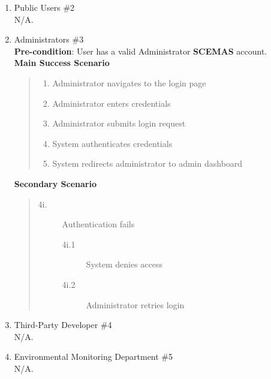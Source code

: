 \documentclass[]{article}
\begin{document}
\begin{enumerate}[{\bf BE10.}]
\begin{enumerate}[{\bf VP1.}]
            \item Public Users \#2\\
                N/A.

            \item Administrators \#3\\
                \textbf{Pre-condition}: User has a valid Administrator \textbf{SCEMAS} account.\\
                \textbf{Main Success Scenario}
                \begin{quote}
                    \begin{enumerate}[1.]
                        \item Administrator navigates to the login page
                        \item Administrator enters credentials
                        \item Administrator submits login request
                        \item System authenticates credentials
                        \item System redirects administrator to admin dashboard
                    \end{enumerate}
                \end{quote}
                \textbf{Secondary Scenario}
                \begin{quote}
                    \begin{description}
                        \item[\textmd{4i.}] Authentication fails
                        \begin{description}
                            \item[\textmd{4i.1}] System denies access
                            \item[\textmd{4i.2}] Administrator retries login
                        \end{description}
                    \end{description}
                \end{quote}

            \item Third-Party Developer \#4\\
                N/A.

            \item Environmental Monitoring Department \#5\\
                N/A.


\end{enumerate}
\end{enumerate}
\end{document}
